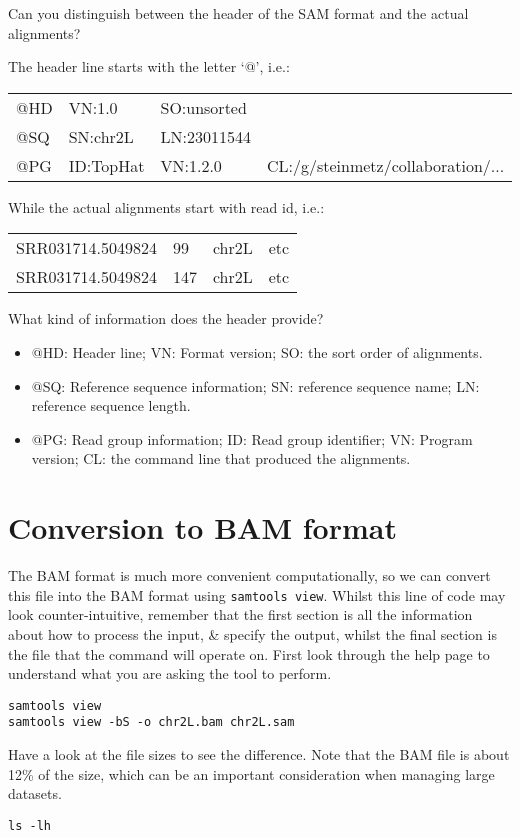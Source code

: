 \begin{questions}
Can you distinguish between the header of the SAM format and the actual alignments?
\begin{answer}
The header line starts with the letter `@', i.e.: \\
\begin{tabular}{llll}
@HD & VN:1.0 & SO:unsorted & \\
@SQ & SN:chr2L & LN:23011544 & \\
@PG & ID:TopHat	& VN:1.2.0 & CL:/g/steinmetz/collaboration/... \\
\end{tabular}

While the actual alignments start with read id, i.e.: \\

\begin{tabular}{llll}
SRR031714.5049824 & 99 & chr2L & etc \\
SRR031714.5049824 & 147 & chr2L & etc \\
\end{tabular}

\end{answer}
What kind of information does the header provide? \\
\begin{answer}
\begin{itemize}
\item @HD: Header line; VN: Format version; SO: the sort order of alignments.
\item @SQ: Reference sequence information; SN: reference sequence name; LN: reference sequence length.
\item @PG: Read group information; ID: Read group identifier; VN: Program version; CL: the command line that produced the alignments.
\end{itemize}
\end{answer}
\end{questions}

\section{Conversion to BAM format}
\begin{steps}
The BAM format is much more convenient computationally, so we can convert this file into the BAM format using \texttt{samtools view}.
Whilst this line of code may look counter-intuitive, remember that the first section is all the information about how to process the input, \& specify the output, whilst the final section is the file that the command will operate on.
First look through the help page to understand what you are asking the tool to perform. \\
\begin{lstlisting}
samtools view 
samtools view -bS -o chr2L.bam chr2L.sam
\end{lstlisting}
Have a look at the file sizes to see the difference.
Note that the BAM file is about 12\% of the size, which can be an important consideration when managing large datasets.
\begin{lstlisting}
ls -lh
\end{lstlisting}
\end{steps}

